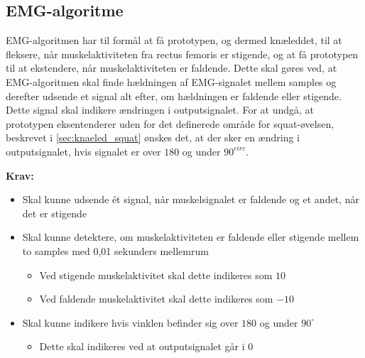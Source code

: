 \subsection{EMG-algoritme}\label{sec:krav_emg_algo}
EMG-algoritmen har til formål at få prototypen, og dermed knæleddet, til at fleksere, når muskelaktiviteten fra rectus femoris er stigende, og at få prototypen til at ekstendere, når muskelaktiviteten er faldende. Dette skal gøres ved, at EMG-algoritmen skal finde hældningen af EMG-signalet mellem samples og derefter udsende et signal alt efter, om hældningen er faldende eller stigende. Dette signal skal indikere ændringen i outputsignalet. 
For at undgå, at prototypen eksentenderer uden for det definerede område for squat-øvelsen, beskrevet i \autoref{sec:knaeled_squat} ønskes det, at der sker en ændring i outputsignalet, hvis signalet er over $180$ og under $90^{circ}$.

\vspace{3mm}
\textbf{Krav:}
\begin{itemize}
\item Skal kunne udsende ét signal, når muskelsignalet er faldende og et andet, når det er stigende
\item Skal kunne detektere, om muskelaktiviteten er faldende eller stigende mellem to samples med 0,01 sekunders mellemrum
\begin{itemize}
\item Ved stigende muskelaktivitet skal dette indikeres som $10$
\item Ved faldende muskelaktivitet skal dette indikeres som $-10$
\end{itemize}
\item Skal kunne indikere hvis vinklen befinder sig over $180$ og under $90^{\circ}$
\begin{itemize}
\item Dette skal indikeres ved at outputsignalet går i $0$
\end{itemize}
\end{itemize}



